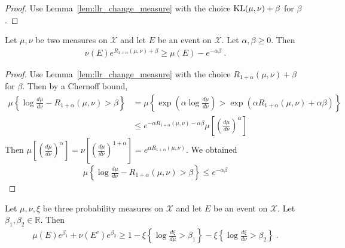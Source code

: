 \begin{proof}
Use Lemma~\ref{lem:llr_change_measure} with the choice $\mathrm{KL}(\mu, \nu) + \beta$ for $\beta$.
\end{proof}

\begin{lemma}
  \label{lem:renyi_change_measure}
  Let $\mu, \nu$ be two measures on $\mathcal X$ and let $E$ be an event on $\mathcal X$. Let $\alpha,\beta \ge 0$. Then
  \begin{align*}
  \nu(E) e^{R_{1+\alpha}(\mu, \nu) + \beta} \ge \mu(E) - e^{-\alpha \beta} \: .
  \end{align*}
\end{lemma}

\begin{proof}
Use Lemma~\ref{lem:llr_change_measure} with the choice $R_{1+\alpha}(\mu, \nu) + \beta$ for $\beta$. Then by a Chernoff bound,
\begin{align*}
\mu\left\{ \log\frac{d \mu}{d \nu} - R_{1+\alpha}(\mu, \nu) > \beta \right\}
&= \mu\left\{ \exp\left(\alpha\log\frac{d \mu}{d \nu}\right) > \exp\left(\alpha R_{1+\alpha}(\mu, \nu) + \alpha \beta\right) \right\}
\\
&\le e^{-\alpha R_{1+\alpha}(\mu, \nu) - \alpha \beta} \mu\left[\left(\frac{d \mu}{d \nu}\right)^\alpha \right]
\end{align*}
Then $\mu\left[\left(\frac{d \mu}{d \nu}\right)^\alpha \right] = \nu\left[\left(\frac{d \mu}{d \nu}\right)^{1+\alpha} \right] = e^{\alpha R_{1+\alpha}(\mu, \nu)}$. We obtained
\begin{align*}
\mu\left\{ \log\frac{d \mu}{d \nu} - R_{1+\alpha}(\mu, \nu) > \beta \right\}
\le e^{- \alpha \beta}
\end{align*}
\end{proof}

\begin{lemma}
  \label{lem:llr_change_measure_add}
  Let $\mu, \nu, \xi$ be three probability measures on $\mathcal X$ and let $E$ be an event on $\mathcal X$. Let $\beta_1, \beta_2 \in \mathbb{R}$. Then
  \begin{align*}
  \mu(E) e^{\beta_1} + \nu(E^c) e^{\beta_2} \ge 1 - \xi\left\{ \log\frac{d \xi}{d \mu} > \beta_1 \right\} - \xi\left\{ \log\frac{d \xi}{d \nu} > \beta_2 \right\} \: .
  \end{align*}
\end{lemma}

